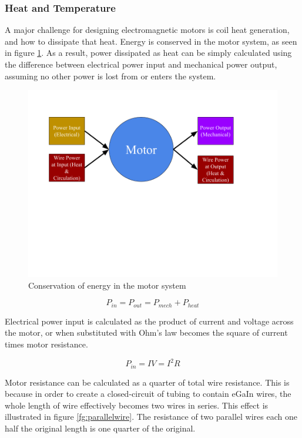 \documentclass[a4paper,12pt]{article}
\begin{document}
\subsubsection{Heat and Temperature}

A major challenge for designing electromagnetic motors is coil heat generation, and how to dissipate that heat. Energy is conserved in the motor system, as seen in figure \ref{fg:motorheat}. As a result, power dissipated as heat can be simply calculated using the difference between electrical power input and mechanical power output, assuming no other power is lost from or enters the system.

\begin{figure}[h!]
    \centering
    \includegraphics[scale=0.4]{motorheat.png}
    \caption{Conservation of energy in the motor system}
    \label{fg:motorheat}
    \end{figure}
    \begin{equation}\label{eq:pbreakdown}
    P_{in}=P_{out}=P_{mech}+P_{heat}
\end{equation}

Electrical power input is calculated as the product of current and voltage across the motor, or when substituted with Ohm's law becomes the square of current times motor resistance.

\begin{equation}\label{eq:pin}
    P_{in} = IV = I^2R
\end{equation}

Motor resistance can be calculated as a quarter of total wire resistance. This is because in order to create a closed-circuit of tubing to contain eGaIn wires, the whole length of wire effectively becomes two wires in series. This effect is illustrated in figure \ref{fg:parallelwire}. The resistance of two parallel wires each one half the original length is one quarter of the original.
\end{document}
